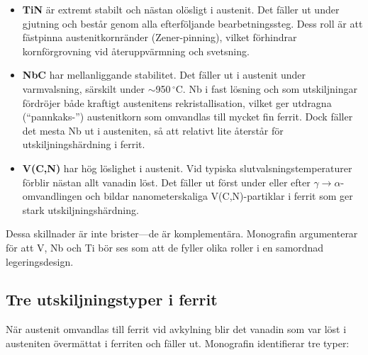 \documentclass[11pt,a4paper]{article}
\begin{document}
\begin{itemize}
  \item \textbf{TiN} \"ar extremt stabilt och n\"astan ol\"osligt i
    austenit.  Det f\"aller ut under gjutning och best\aa{}r genom alla
    efterf\"oljande bearbetningssteg.  Dess roll \"ar att f\"astpinna
    austenitkornr\"ander (Zener-pinning), vilket f\"orhindrar
    kornf\"orgrovning vid \aa{}teruppv\"armning och svetsning.
  \item \textbf{NbC} har mellanliggande stabilitet.  Det f\"aller ut i
    austenit under varmvalsning, s\"arskilt under
    $\sim$950\,${}^\circ$C.  Nb i fast l\"osning och som utskiljningar
    f\"ordr\"ojer b\aa{}de kraftigt austenitens rekristallisation, vilket
    ger utdragna (``pannkaks-'') austenitkorn som omvandlas till mycket
    fin ferrit.  Dock f\"aller det mesta Nb ut i austeniten, s\aa{} att
    relativt lite \aa{}terst\aa{}r f\"or utskiljningsh\"ardning i ferrit.
  \item \textbf{V(C,N)} har h\"og l\"oslighet i austenit.  Vid typiska
    slutvalsningstemperaturer f\"orblir n\"astan allt vanadin l\"ost.
    Det f\"aller ut f\"orst under eller efter
    $\gamma\to\alpha$-omvandlingen och bildar nanometerskaliga
    V(C,N)-partiklar i ferrit som ger stark utskiljningsh\"ardning.
\end{itemize}

Dessa skillnader \"ar inte brister---de \"ar komplement\"ara.
Monografin argumenterar f\"or att V, Nb och Ti b\"or ses som att de
fyller olika roller i en samordnad legeringsdesign.

\subsection{Tre utskiljningstyper i ferrit}

N\"ar austenit omvandlas till ferrit vid avkylning blir det vanadin som
var l\"ost i austeniten \"overm\"attat i ferriten och f\"aller ut.
Monografin identifierar tre typer:
\end{document}
